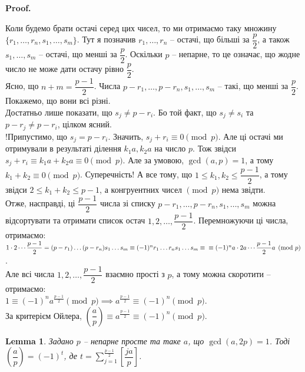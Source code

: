 \documentclass[a4paper, 14pt]{extarticle}
\makeatletter
\theoremstyle{theoremdd}
\theoremstyle{theoremdd}
\theoremstyle{theoremdd}
\theoremstyle{theoremdd}
\theoremstyle{theoremdd}
\theoremstyle{theoremdd}
\theoremstyle{theoremdd}
\newtheorem{lemma}[theorem]{Lemma}
\theoremstyle{theoremdd}
\def\qed{$\blacksquare$}
\renewenvironment{proof}[1][Proof.\\]{\par
\pushQED{\hfill \qed}%
\normalfont \topsep6\p@\@plus6\p@\relax
\trivlist
\item\relax
{\bfseries
#1\@addpunct{.}}\hspace\labelsep\ignorespaces
}{%
\popQED\endtrivlist\@endpefalse
}
\makeatother
\begin{document}
\begin{proof}
Коли будемо брати остачі серед цих чисел, то ми отримаємо таку множину $\{r_1,\dots,r_n,s_1,\dots,s_m\}$. Тут я позначив $r_1,\dots,r_n$ -- остачі, що більші за $\dfrac{p}{2}$, а також $s_1,\dots,s_m$ -- остачі, що менші за $\dfrac{p}{2}$. Оскільки $p$ -- непарне, то це означає, що жодне число не може дати остачу рівно $\dfrac{p}{2}$.\\
Ясно, що $n+m = \dfrac{p-1}{2}$. Числа $p-r_1,\dots,p-r_n,s_1,\dots,s_m$ -- такі, що менші за $\dfrac{p}{2}$. Покажемо, що вони всі різні.\\
Достатньо лише показати, що $s_j \neq p-r_i$. Бо той факт, що $s_j \neq s_i$ та $p-r_j \neq p-r_i$, цілком ясний.\\
!Припустимо, що $s_j = p-r_i$. Значить, $s_j + r_i \equiv 0 \pmod p$. Але ці остачі ми отримували в результаті ділення $k_1a, k_2a$ на число $p$. Тож звідси $s_j + r_i \equiv k_1a+k_2a \equiv 0 \pmod p$. Але за умовою, $\gcd(a,p)=1$, а тому $k_1+k_2 \equiv 0 \pmod p$. Суперечність! А все тому, що $1 \leq k_1,k_2 \leq \dfrac{p-1}{2}$, а тому звідси $2 \leq k_1+k_2 \leq p-1$, а конгруентних чисел $\pmod p$ нема звідти.\\
Отже, насправді, ці $\dfrac{p-1}{2}$ числа зі списку $p-r_1,\dots,p-r_n,s_1,\dots,s_m$ можна відсортувати та отримати список остач $1,2,\dots,\dfrac{p-1}{2}$. Перемножуючи ці числа, отримаємо:\\
$1 \cdot 2 \cdots \dfrac{p-1}{2} = (p-r_1) \dots (p-r_n) s_1 \dots s_m \equiv (-1)^n r_1 \dots r_n s_1 \dots s_m \equiv \\
\equiv (-1)^n a \cdot 2a \cdots \dfrac{p-1}{2}a \pmod p$.\\
Але всі числа $1,2,\dots,\dfrac{p-1}{2}$ взаємно прості з $p$, а тому можна скоротити -- отримаємо:\\
$1 \equiv (-1)^n a^{\textstyle\frac{p-1}{2}} \pmod p \implies a^{\textstyle\frac{p-1}{2}} \equiv (-1)^n \pmod p$.\\
За критерієм Ойлера, $\left( \dfrac{a}{p} \right) \equiv a^{\textstyle\frac{p-1}{2}} \equiv (-1)^n \pmod p$.
\end{proof}

\begin{lemma}
Задано $p$ -- непарне просте та таке $a$, що $\gcd(a,2p) = 1$. Тоді $\left( \dfrac{a}{p} \right) = (-1)^t$, де $t = \displaystyle\sum_{j=1}^{\frac{p-1}{2}} \left[ \dfrac{ja}{p} \right]$.
\end{lemma}
\end{document}
